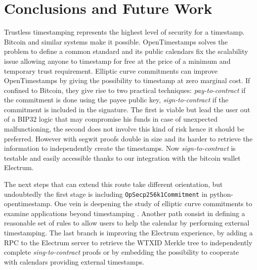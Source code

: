 \chapter{Conclusions and Future Work}
\label{chpr:conclusions}
Trustless timestamping represents the highest level of security for a timestamp. 
Bitcoin and similar systems make it possible.
OpenTimestamps solves the problem to define a common standard and its public calendars fix the scalability issue allowing anyone to timestamp for free at the price of a minimum and temporary trust requirement.
Elliptic curve commitments can improve OpenTimestamps by giving the possibility to timestamp at zero marginal cost. 
If confined to Bitcoin, they give rise to two practical techniques: \textit{pay-to-contract} if the commitment is done using the payee public key, \textit{sign-to-contract} if the commitment is included in the signature. 
The first is viable but lead the user out of a BIP32 logic that may compromise his funds in case of unexpected malfunctioning, the second does not involve this kind of risk hence it should be preferred. 
However with segwit proofs double in size and its harder to retrieve the information to independently create the timestamps.
Now \textit{sign-to-contract} is testable and easily accessible thanks to our integration with the bitcoin wallet Electrum.

The next steps that can extend this route take different orientation, but undoubtedly the first stage is including \verb|OpSecp256k1Commitment| in python-opentimestamp.
One vein is deepening the study of elliptic curve commitments to examine applications beyond timestamping \cite{TapRoot}.
Another path consist in defining a reasonable set of rules to allow users to help the calendar by performing external timestamping.
The last branch is improving the Electrum experience, by adding a RPC to the Electrum server to retrieve the WTXID Merkle tree to independently complete \textit{sing-to-contract} proofs or by embedding the possibility to cooperate with calendars providing external timestamps.
